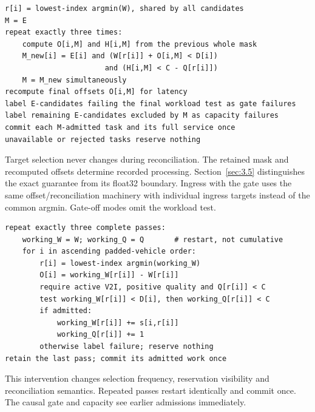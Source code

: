 \documentclass[12pt,a4paper]{article}
\begin{document}
\begin{algorithm}[htbp]
\caption{common-target placement with gate (one substep)}\label{alg:1}
\begin{Verbatim}[fontsize=\small,breaklines=true]
r[i] = lowest-index argmin(W), shared by all candidates
M = E
repeat exactly three times:
    compute O[i,M] and H[i,M] from the previous whole mask
    M_new[i] = E[i] and (W[r[i]] + O[i,M] < D[i])
                       and (H[i,M] < C - Q[r[i]])
    M = M_new simultaneously
recompute final offsets O[i,M] for latency
label E-candidates failing the final workload test as gate failures
label remaining E-candidates excluded by M as capacity failures
commit each M-admitted task and its full service once
unavailable or rejected tasks reserve nothing
\end{Verbatim}
\end{algorithm}

Target selection never changes during reconciliation. The retained mask and recomputed offsets determine recorded processing. Section~\ref{sec:3.5} distinguishes the exact guarantee from its float32 boundary. Ingress with the gate uses the same offset/reconciliation machinery with individual ingress targets instead of the common argmin. Gate-off modes omit the workload test.

\begin{algorithm}[htbp]
\caption{causal per-task placement with gate (one substep)}\label{alg:2}
\begin{Verbatim}[fontsize=\small,breaklines=true]
repeat exactly three complete passes:
    working_W = W; working_Q = Q       # restart, not cumulative
    for i in ascending padded-vehicle order:
        r[i] = lowest-index argmin(working_W)
        O[i] = working_W[r[i]] - W[r[i]]
        require active V2I, positive quality and Q[r[i]] < C
        test working_W[r[i]] < D[i], then working_Q[r[i]] < C
        if admitted:
            working_W[r[i]] += s[i,r[i]]
            working_Q[r[i]] += 1
        otherwise label failure; reserve nothing
retain the last pass; commit its admitted work once
\end{Verbatim}
\end{algorithm}

This intervention changes selection frequency, reservation visibility and reconciliation semantics. Repeated passes restart identically and commit once. The causal gate and capacity see earlier admissions immediately.
\end{document}
